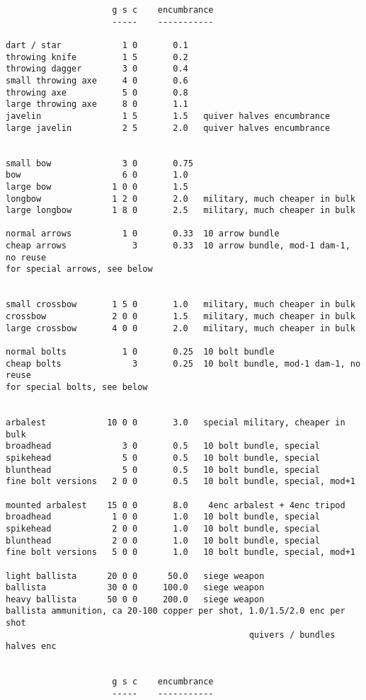 \begin{verbatim}
                     g s c    encumbrance
                     -----    -----------

dart / star            1 0       0.1
throwing knife         1 5       0.2
throwing dagger        3 0       0.4
small throwing axe     4 0       0.6
throwing axe           5 0       0.8
large throwing axe     8 0       1.1
javelin                1 5       1.5   quiver halves encumbrance
large javelin          2 5       2.0   quiver halves encumbrance


small bow              3 0       0.75
bow                    6 0       1.0
large bow            1 0 0       1.5
longbow              1 2 0       2.0   military, much cheaper in bulk
large longbow        1 8 0       2.5   military, much cheaper in bulk

normal arrows          1 0       0.33  10 arrow bundle
cheap arrows             3       0.33  10 arrow bundle, mod-1 dam-1, no reuse
for special arrows, see below


small crossbow       1 5 0       1.0   military, much cheaper in bulk
crossbow             2 0 0       1.5   military, much cheaper in bulk
large crossbow       4 0 0       2.0   military, much cheaper in bulk

normal bolts           1 0       0.25  10 bolt bundle
cheap bolts              3       0.25  10 bolt bundle, mod-1 dam-1, no reuse
for special bolts, see below


arbalest            10 0 0       3.0   special military, cheaper in bulk
broadhead              3 0       0.5   10 bolt bundle, special
spikehead              5 0       0.5   10 bolt bundle, special
blunthead              5 0       0.5   10 bolt bundle, special
fine bolt versions   2 0 0       0.5   10 bolt bundle, special, mod+1

mounted arbalest    15 0 0       8.0    4enc arbalest + 4enc tripod
broadhead            1 0 0       1.0   10 bolt bundle, special
spikehead            2 0 0       1.0   10 bolt bundle, special
blunthead            2 0 0       1.0   10 bolt bundle, special
fine bolt versions   5 0 0       1.0   10 bolt bundle, special, mod+1

light ballista      20 0 0      50.0   siege weapon
ballista            30 0 0     100.0   siege weapon
heavy ballista      50 0 0     200.0   siege weapon
ballista ammunition, ca 20-100 copper per shot, 1.0/1.5/2.0 enc per shot
                                                quivers / bundles halves enc


                     g s c    encumbrance
                     -----    -----------


\end{verbatim}

